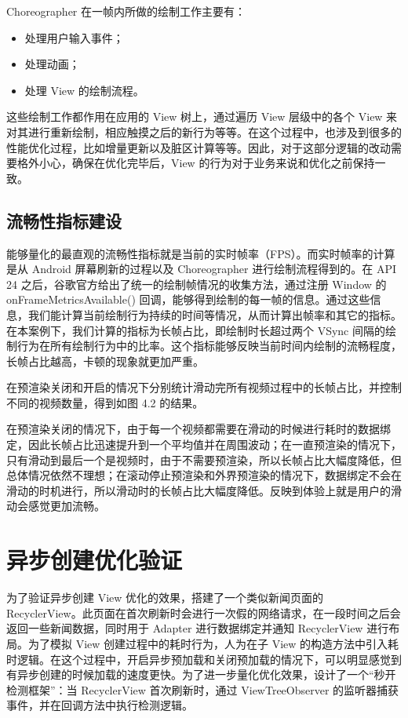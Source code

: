 Choreographer 在一帧内所做的绘制工作主要有：

\begin{itemize}
    \item 处理用户输入事件；
    \item 处理动画；
    \item 处理 View 的绘制流程。
\end{itemize}

这些绘制工作都作用在应用的 View 树上，通过遍历 View 层级中的各个 View 来对其进行重新绘制，相应触摸之后的新行为等等。在这个过程中，也涉及到很多的性能优化过程，比如增量更新以及脏区计算等等。因此，对于这部分逻辑的改动需要格外小心，确保在优化完毕后，View 的行为对于业务来说和优化之前保持一致。

\subsection{流畅性指标建设}

能够量化的最直观的流畅性指标就是当前的实时帧率（FPS）。而实时帧率的计算是从 Android 屏幕刷新的过程以及 Choreographer 进行绘制流程得到的。在 API 24 之后，谷歌官方给出了统一的绘制帧情况的收集方法，通过注册 Window 的 onFrameMetricsAvailable() 回调，能够得到绘制的每一帧的信息。通过这些信息，我们能计算当前绘制行为持续的时间等情况，从而计算出帧率和其它的指标。在本案例下，我们计算的指标为长帧占比，即绘制时长超过两个 VSync 间隔的绘制行为在所有绘制行为中的比率。这个指标能够反映当前时间内绘制的流畅程度，长帧占比越高，卡顿的现象就更加严重。

在预渲染关闭和开启的情况下分别统计滑动完所有视频过程中的长帧占比，并控制不同的视频数量，得到如图 4.2 的结果。
    


在预渲染关闭的情况下，由于每一个视频都需要在滑动的时候进行耗时的数据绑定，因此长帧占比迅速提升到一个平均值并在周围波动；在一直预渲染的情况下，只有滑动到最后一个是视频时，由于不需要预渲染，所以长帧占比大幅度降低，但总体情况依然不理想；在滚动停止预渲染和外界预渲染的情况下，数据绑定不会在滑动的时机进行，所以滑动时的长帧占比大幅度降低。反映到体验上就是用户的滑动会感觉更加流畅。

\section{异步创建优化验证}

为了验证异步创建 View 优化的效果，搭建了一个类似新闻页面的 RecyclerView。此页面在首次刷新时会进行一次假的网络请求，在一段时间之后会返回一些新闻数据，同时用于 Adapter 进行数据绑定并通知 RecyclerView 进行布局。为了模拟 View 创建过程中的耗时行为，人为在子 View 的构造方法中引入耗时逻辑。在这个过程中，开启异步预加载和关闭预加载的情况下，可以明显感觉到有异步创建的时候加载的速度更快。为了进一步量化优化效果，设计了一个“秒开检测框架”：当 RecyclerView 首次刷新时，通过 ViewTreeObserver 的监听器捕获事件，并在回调方法中执行检测逻辑。

